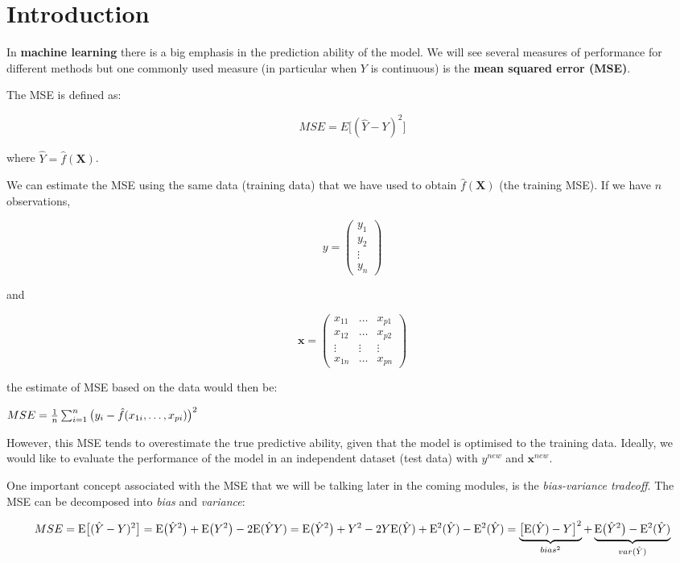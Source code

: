 \documentclass[
]{book}
\begin{document}
\hypertarget{maccuracy.intro}{%
\section{Introduction}\label{maccuracy.intro}}

In \textbf{machine learning} there is a big emphasis in the prediction ability
of the model. We will see several measures of performance for different methods
but one commonly used measure (in particular when \(Y\) is continuous) is the
\textbf{mean squared error (MSE)}.

The MSE is defined as:

\[
MSE = E \big[ (\hat{Y} - Y)^2 \big]
\]

where \(\hat{Y} = \hat f(\mathbf{X})\).

We can estimate the MSE using the same data (training data)
that we have used to obtain
\(\hat f(\mathbf{X})\) (the training MSE). If we have \(n\) observations,

\[
y=
\begin{pmatrix}
y_1 \\
y_2 \\
\vdots\\
y_n
\end{pmatrix}
\]

and

\[
 \mathbf{x}=
\begin{pmatrix}
x_{11} & \dots & x_{p1} \\
x_{12} & \dots & x_{p2} \\
\vdots & \vdots & \vdots\\
x_{1n} & \dots & x_{pn}
\end{pmatrix}
\]

the estimate of MSE based on the data would then be:

\(MSE = \frac{1}{n} \sum_{i=1}^n \big(y_i - \hat f(x_{1i},\dots, x_{pi})\big)^2\\\)

However, this MSE tends to overestimate the true predictive ability,
given that the model is optimised to the training data. Ideally, we
would like to evaluate the performance of the model
in an independent dataset (test data) with \(y^{new}\) and \(\mathbf{x}^{new}\).

One important concept associated with the MSE that we will be talking later in
the coming modules, is the \emph{bias-variance tradeoff}. The MSE can be decomposed
into \emph{bias} and \emph{variance}:

\begin{equation}
MSE  = \mathrm{E} \big[ (\hat{Y} - Y)^2 \big] \\
 =\mathrm{E} \big(\hat{Y}^2\big) + \mathrm{E}\big(Y^2\big) - 2\mathrm{E}(\hat{Y}Y) \\  = \mathrm{E} \big(\hat{Y}^2\big) + Y^2 - 2Y\mathrm{E}(\hat{Y}) + \mathrm{E}^2(\hat{Y}) - \mathrm{E}^2(\hat{Y})\\
 =\underbrace{ \big[\mathrm{E}(\hat{Y}) - Y \big]^2}_{bias^2} + \underbrace{\mathrm{E} \big(\hat{Y}^2\big) - \mathrm{E}^2(\hat{Y})}_{var(\hat{Y})}
\end{equation}
\end{document}
